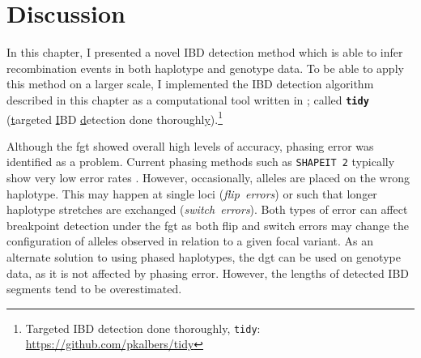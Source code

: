 %
%
%



%
\section{Discussion}
%


In this chapter, I presented a novel IBD detection method which is able to infer recombination events in both haplotype and genotype data.
To be able to apply this method on a larger scale, I implemented the IBD detection algorithm described in this chapter as a computational tool written in \cpp; called \textbf{\texttt{tidy}} (\underline{t}argeted \underline{I}BD \underline{d}etection done thoroughl\underline{y}).\footnote{Targeted IBD detection done thoroughly, \texttt{tidy}: \url{https://github.com/pkalbers/tidy}}

Although the \gls{fgt} showed overall high levels of accuracy, phasing error was identified as a problem.
Current phasing methods such as \texttt{SHAPEIT\,2} typically show very low error rates \citep{OConnell:2014fl}.
However, occasionally, alleles are placed on the wrong haplotype.
This may happen at single loci (\emph{flip~errors}) or such that longer haplotype stretches are exchanged (\emph{switch~errors}).
Both types of error can affect breakpoint detection under the \gls{fgt} as both flip and switch errors may change the configuration of alleles observed in relation to a given focal variant.
As an alternate solution to using phased haplotypes, the \gls{dgt} can be used on genotype data, as it is not affected by phasing error.
However, the lengths of detected IBD segments tend to be overestimated.

